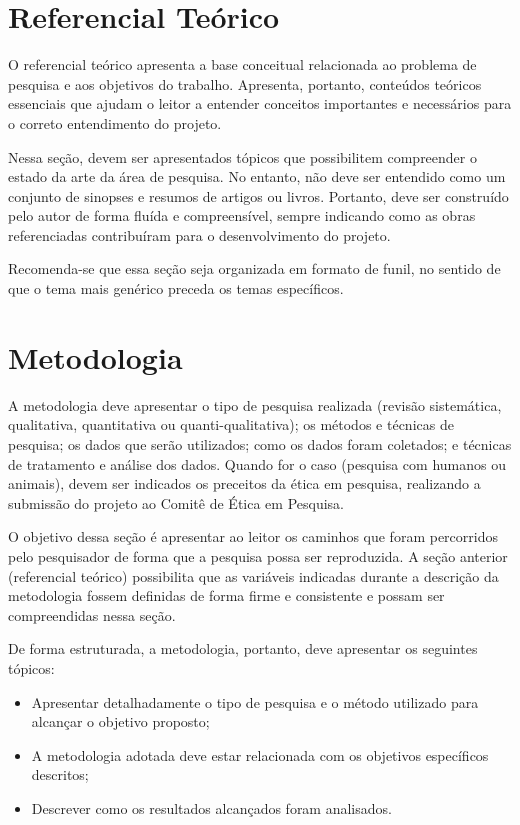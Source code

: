\documentclass[
	article,			%
	11pt,				%
	oneside,			%
	a4paper,			%
	english,			%
	brazil,				%
	sumario=tradicional
	]{abntex2}
\begin{document}
\section{Referencial Teórico}

O referencial teórico apresenta a base conceitual relacionada ao problema de pesquisa e aos objetivos do trabalho. Apresenta, portanto, conteúdos teóricos essenciais que ajudam o leitor a entender conceitos importantes e necessários para o correto entendimento do projeto.

Nessa seção, devem ser apresentados tópicos que possibilitem compreender o estado da arte da área de pesquisa. No entanto, não deve ser entendido como um conjunto de sinopses e resumos de artigos ou livros. Portanto, deve ser construído pelo autor de forma fluída e compreensível, sempre indicando como as obras referenciadas contribuíram para o desenvolvimento do projeto.

Recomenda-se que essa seção seja organizada em formato de funil, no sentido de que o tema mais genérico preceda os temas específicos.


\section{Metodologia}

A metodologia deve apresentar o tipo de pesquisa realizada (revisão sistemática, qualitativa, quantitativa ou quanti-qualitativa); os métodos e técnicas de pesquisa; os dados que serão utilizados; como os dados foram coletados; e técnicas de tratamento e análise dos dados. Quando for o caso (pesquisa com humanos ou animais), devem ser indicados os preceitos da ética em pesquisa, realizando a submissão do projeto ao Comitê de Ética em Pesquisa.

O objetivo dessa seção é apresentar ao leitor os caminhos que foram percorridos pelo pesquisador de forma que a pesquisa possa ser reproduzida. A seção anterior (referencial teórico) possibilita que as variáveis indicadas durante a descrição da metodologia fossem definidas de forma firme e consistente e possam ser compreendidas nessa seção.

De forma estruturada, a metodologia, portanto, deve apresentar os seguintes tópicos:

\begin{itemize}
\item Apresentar detalhadamente o tipo de pesquisa e o método utilizado para alcançar o objetivo proposto;
\item A metodologia adotada deve estar relacionada com os objetivos específicos descritos;
\item Descrever como os resultados alcançados foram analisados.
\end{itemize}
\end{document}

